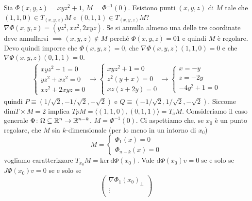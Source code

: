 \documentclass[a4paper]{article}
\begin{document}
\begin{snippetexample}{}
    Sia \(\Phi(x,y,z) = xyz^2 + 1\), \(M = \Phi^{-1}(0)\).
    Esistono punti \((x,y,z)\) di \(M\) tale che \((1,1,0) \in T_{(x,y,z)}M\) e
    \((0,1,1)\in T_{(x,y,z)}M\)?
    \(\nabla \Phi(x,y,z) = (yz^2,xz^2, 2xyz)\). Se si annulla almeno una delle tre coordinate 
    deve annullarsi \(\implies (x,y,z) \notin M\) perché \(\Phi(x,y,z) = 01\) e quindi \(M\) è regolare.
    Devo quindi imporre che \(\Phi(x,y,z) = 0\), che \(\nabla \Phi(x,y,z)(1,1,0) = 0\) e che
    \(\nabla \Phi(x,y,z)(0,1,1) = 0\).
    \begin{align*}
        \begin{cases}
            xyz^2 + 1 = 0\\
            yz^2 + xz^2 = 0\\
            xz^2 + 2xyz = 0
        \end{cases}
        \to
        \begin{cases}
            xyz^2 + 1 = 0 \\
            z^2(y + x) = 0 \\
            xz(z + 2y) = 0
        \end{cases}
        \to
        \begin{cases}
            x = -y \\
            z = -2y \\
            -4y^2 + 1 = 0
        \end{cases}
    \end{align*}
    quindi \(P \equiv (1 / \sqrt{2}, -1/\sqrt{2}, -\sqrt{2})\) e \(Q \equiv (-1/\sqrt{2}, 1/\sqrt{2}, -\sqrt{2})\).
    Siccome \(\text{dim} T \times M = 2\) implica \(TpM = \langle(1,1,0),(0,1,1)\rangle = T_aM\).
    Consideriamo il caso generale \(\Phi \colon \Omega \subseteq \mathbb{R}^n \to \mathbb{R}^{n-k}\).
    \(M = \Phi^{-1}(0)\). Ci aspettiamo che, se \(x_0\) è un punto regolare,
    che \(M\) sia \(k\)-dimensionale (per lo meno in un intorno di \(x_0\))
    \[
        M = \begin{cases}
            \Phi_1(x) = 0\\
            \Phi_{n-k}(x) = 0
        \end{cases}
    \]
    vogliamo caratterizzare \(T_{x_0} M = \text{ker}\,\text{d}\Phi(x_0)\).
    Vale \(\text{d}\Phi(x_0)v = 0\) se e solo se \(J \Phi(x_0)v = 0\) se e solo se
    \[
        \begin{pmatrix}
            \nabla \Phi_1(x_0)_\perp \\
            \vdots \\

\end{pmatrix}\]
\end{snippetexample}
\end{document}
